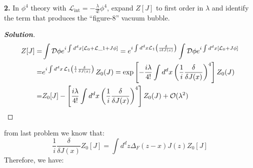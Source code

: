 \documentclass[11pt]{article}
\newenvironment{solution}[1][]{\begin{proof}[\textbf{Solution}]}{\end{proof}}
\begin{document}
	\begin{tcolorbox}[problem]
		\textbf{2.} In \(\phi^4\) theory with \(\mathcal L_{\text{int}}=-\frac{\lambda}{4!}\phi^4\), expand \(Z[J]\) to first order in \(\lambda\) and identify the term that produces the ``figure-8'' vacuum bubble.
	\end{tcolorbox}
	\begin{solution}[11.2]
		\[
		\begin{aligned}
			Z[J]=&\int\mathcal{D}\phi e^{i\int d^d x\left[\mathcal{L}_0+\mathcal{L}\_1+J\phi\right]}=e^{i\int d^d x\mathcal{L}_1\left(\frac{\delta}{i\delta J(x)}\right)}\int \mathcal{D}\phi e^{i\int d^d x\left[\mathcal{L}_0+J\phi\right]}\\
			=&\large e^{\large i\int d^dx\left.\mathcal{L}_1\left(\frac{1}{i}\frac{\delta}{\delta J(x)}\right)\right.}Z_0(J)=\exp\left[-\frac{i\lambda}{4!}\int d^dx\left(\frac{1}{i}\frac{\delta}{\delta J(x)}\right)^4\right]Z_0(J)\\
			=&Z_0[J]-\left[\frac{i\lambda}{4!}\int d^dx\left(\frac{1}{i}\frac{\delta}{\delta J(x)}\right)^4\right]Z_0(J)+\mathcal{O}(\lambda^2)
		\end{aligned}
		\]
	\end{solution}
	from last problem we know that:
	\[
	\frac 1i\frac{\delta}{\delta J(x)}Z_0[J]=\int d^d z\Delta_F(z-x)J(z)Z_0[J]
	\]
	Therefore, we have:
\end{document}

